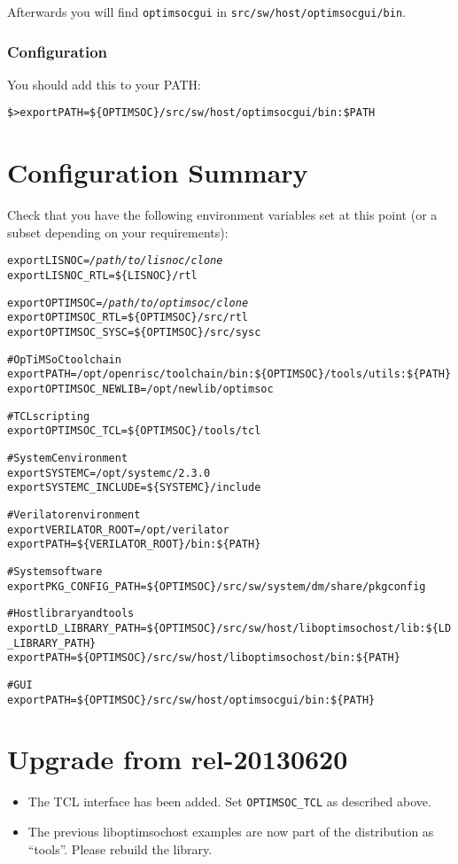 Afterwards you will find \verb|optimsocgui| in
\verb|src/sw/host/optimsocgui/bin|.

\subsubsection{Configuration}
You should add this to your PATH:

\begin{alltt}
\$> export PATH=\$\{OPTIMSOC\}/src/sw/host/optimsocgui/bin:\$PATH
\end{alltt}

\section{Configuration Summary}

Check that you have the following environment variables set at this
point (or a subset depending on your requirements):

\begin{alltt}
export LISNOC=\emph{/path/to/lisnoc/clone}
export LISNOC_RTL=\$\{LISNOC\}/rtl

export OPTIMSOC=\emph{/path/to/optimsoc/clone}
export OPTIMSOC_RTL=\$\{OPTIMSOC\}/src/rtl
export OPTIMSOC_SYSC=\$\{OPTIMSOC\}/src/sysc

# OpTiMSoC toolchain
export PATH=/opt/openrisc/toolchain/bin:\$\{OPTIMSOC\}/tools/utils:\$\{PATH\}
export OPTIMSOC_NEWLIB=/opt/newlib/optimsoc

# TCL scripting
export OPTIMSOC_TCL=\$\{OPTIMSOC\}/tools/tcl

# SystemC environment
export SYSTEMC=/opt/systemc/2.3.0
export SYSTEMC_INCLUDE=\$\{SYSTEMC\}/include

# Verilator environment
export VERILATOR\_ROOT=/opt/verilator
export PATH=\$\{VERILATOR_ROOT\}/bin:\$\{PATH\}

# System software
export PKG_CONFIG_PATH=\$\{OPTIMSOC\}/src/sw/system/dm/share/pkgconfig

# Host library and tools
export LD_LIBRARY_PATH=\$\{OPTIMSOC\}/src/sw/host/liboptimsochost/lib:\$\{LD_LIBRARY_PATH\}
export PATH=\$\{OPTIMSOC\}/src/sw/host/liboptimsochost/bin:\$\{PATH\}

# GUI
export PATH=\$\{OPTIMSOC\}/src/sw/host/optimsocgui/bin:\$\{PATH\}

\end{alltt}

\section{Upgrade from rel-20130620}

\begin{itemize}
  \item The TCL interface has been added. Set \verb|OPTIMSOC_TCL| as
    described above.
  \item The previous liboptimsochost examples are now part of the
    distribution as ``tools''. Please rebuild the library.
\end{itemize}